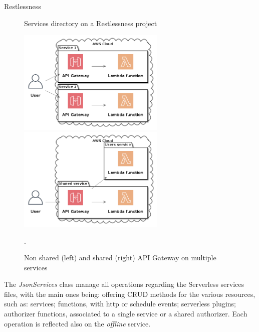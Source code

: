 \begin{chapter}{Restlessness}
    \begin{figure}
        \begin{minipage}{\linewidth}
        \end{minipage}
        \caption{Services directory on a Restlessness project}
        \label{fig:sls_services_dir}
    \end{figure}

    \begin{figure}
        \centering
        \includegraphics[width=7cm]{source/diagrams/multiple_api_gateway.png}
        \includegraphics[width=7cm]{source/diagrams/single_api_gateway.png}
        \caption{Non shared (left) and shared (right) API Gateway on multiple services}
        \label{fig:api_gateway_multiple_services}.
    \end{figure}

    The \textit{JsonServices} class manage all operations regarding the Serverless
    services files, with the main ones being: offering CRUD methods for the various
    resources, such as: services; functions, with http or schedule events;
    serverless plugins; authorizer functions, associated to a single service or a
    shared authorizer.
    Each operation is reflected also on the \textit{offline} service.


\end{chapter}
